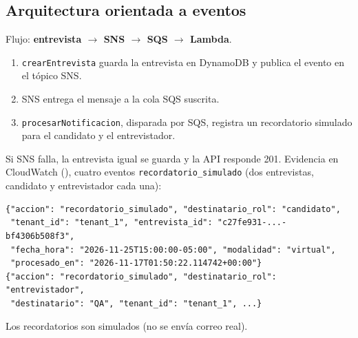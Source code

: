 \subsection{Arquitectura orientada a eventos}
Flujo: \textbf{entrevista $\rightarrow$ SNS $\rightarrow$ SQS $\rightarrow$ Lambda}.
\begin{enumerate}
\item \texttt{crearEntrevista} guarda la entrevista en DynamoDB y publica el evento en el tópico SNS.
\item SNS entrega el mensaje a la cola SQS suscrita.
\item \texttt{procesarNotificacion}, disparada por SQS, registra un recordatorio simulado para el candidato y el entrevistador.
\end{enumerate}
Si SNS falla, la entrevista igual se guarda y la API responde 201. Evidencia en CloudWatch (), cuatro eventos \texttt{recordatorio\_simulado} (dos entrevistas, candidato y entrevistador cada una):
\begin{lstlisting}[basicstyle=\ttfamily\scriptsize]
{"accion": "recordatorio_simulado", "destinatario_rol": "candidato",
 "tenant_id": "tenant_1", "entrevista_id": "c27fe931-...-bf4306b508f3",
 "fecha_hora": "2026-11-25T15:00:00-05:00", "modalidad": "virtual",
 "procesado_en": "2026-11-17T01:50:22.114742+00:00"}
{"accion": "recordatorio_simulado", "destinatario_rol": "entrevistador",
 "destinatario": "QA", "tenant_id": "tenant_1", ...}
\end{lstlisting}
Los recordatorios son simulados (no se envía correo real).
